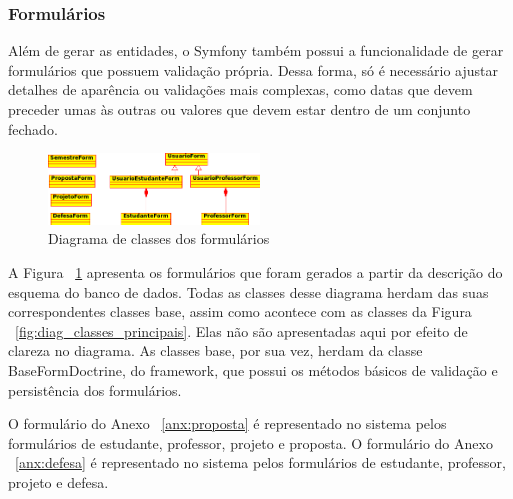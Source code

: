 \subsubsection{Formulários}
Além de gerar as entidades, o Symfony também possui a funcionalidade de gerar formulários que
possuem validação própria. Dessa forma, só é necessário ajustar detalhes de aparência ou
validações mais complexas, como datas que devem preceder umas às outras ou valores que devem 
estar dentro de um conjunto fechado.

\begin{figure}[htbp]
\centering
\includegraphics[width=0.5\textwidth]{fig/uml_forms.png}
\caption{Diagrama de classes dos formulários}
\label{fig:diag_forms}
\end{figure}

A Figura ~\ref{fig:diag_forms} apresenta os formulários que foram gerados a partir da descrição 
do esquema do banco de dados. Todas as classes desse diagrama herdam das suas correspondentes 
classes base, assim como acontece com as classes da Figura ~\ref{fig:diag_classes_principais}.
Elas não são apresentadas aqui por efeito de clareza no diagrama. As classes base, por sua vez,
herdam da classe BaseFormDoctrine, do framework, que possui os métodos básicos de validação e 
persistência dos formulários. 

O formulário do Anexo ~\ref{anx:proposta} é representado no sistema pelos formulários de estudante, 
professor, projeto e proposta. O formulário do Anexo ~\ref{anx:defesa} é representado no sistema 
pelos formulários de estudante, professor, projeto e defesa. 

